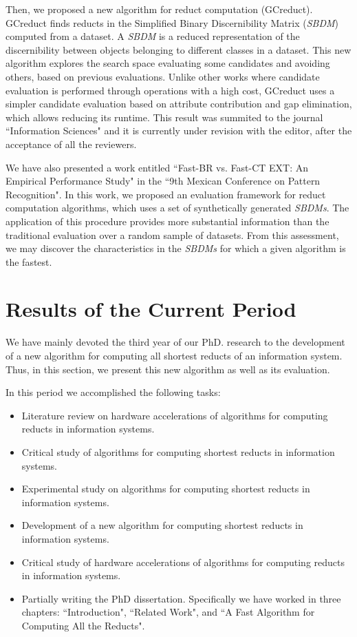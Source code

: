 \documentclass[authoryear,11pt]{elsarticle}
\begin{document}
  Then, we proposed a new algorithm for reduct computation (GCreduct). GCreduct finds reducts in the Simplified Binary Discernibility Matrix (\textit{SBDM}) computed from a dataset. A \textit{SBDM} is a reduced representation of the discernibility between objects belonging to different classes in a dataset. This new algorithm explores the search space evaluating some candidates and avoiding others, based on previous evaluations. Unlike other works \citep{WangP07,Lias13} where candidate evaluation is performed through operations with a high cost, GCreduct uses a simpler candidate evaluation based on attribute contribution and gap elimination, which allows reducing its runtime. This result was summited to the journal ``Information Sciences" and it is currently under revision with the editor, after the acceptance of all the reviewers.
  
  We have also presented a work entitled ``Fast-BR vs. Fast-CT EXT: An Empirical Performance Study" in the ``9th Mexican Conference on Pattern Recognition". In this work, we proposed an evaluation framework for reduct computation algorithms, which uses a set of synthetically generated \textit{SBDMs}. The application of this procedure provides more substantial information than the traditional evaluation over a random sample of datasets. From this assessment, we may discover the characteristics in the \textit{SBDMs} for which a given algorithm is the fastest.


\section{Results of the Current Period}\label{current_results}

  We have mainly devoted the third year of our PhD. research to  the development of a new algorithm for computing all shortest reducts of an information system. Thus, in this section, we present this new algorithm as well as its evaluation.

  In this period we accomplished the following tasks:
  \begin{itemize}
  	\itemsep0em 
  	\item Literature review on hardware accelerations of algorithms for computing reducts in information systems.
  	\item Critical study of algorithms for computing shortest reducts in information systems.
  	\item Experimental study on algorithms for computing shortest reducts in information systems.
  	\item Development of a new algorithm for computing shortest reducts in information systems.
  	\item Critical study of hardware accelerations of algorithms for computing reducts in information systems.
  	\item Partially writing the PhD dissertation. Specifically we have worked in three chapters: ``Introduction", ``Related Work", and ``A Fast Algorithm for Computing All the Reducts".
  \end{itemize}
  
\end{document}
